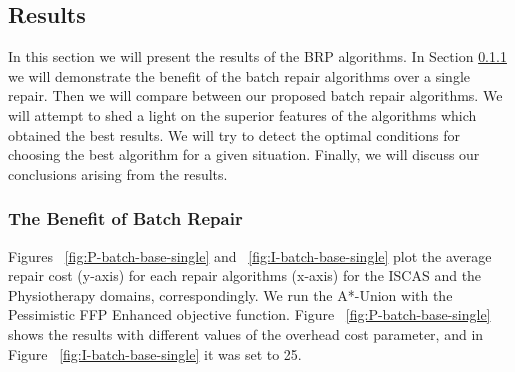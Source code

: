 \documentclass[review]{elsarticle}
\newcommand\meir[1]{\textcolor{red}{meir: #1}}
\begin{document}
\subsection{Results}
In this section we will present the results of the BRP algorithms. In Section \ref{sec:benefit-BR} we will demonstrate the benefit of the batch repair algorithms over a single repair. Then we will compare between our proposed batch repair algorithms. We will attempt to shed a light on the superior features of the algorithms which obtained the best results. We will try to detect the optimal conditions for choosing the best algorithm for a given situation. Finally, we will discuss our conclusions arising from the results. 

\subsubsection{The Benefit of Batch Repair}\label{sec:benefit-BR}


Figures ~\ref{fig:P-batch-base-single} and ~\ref{fig:I-batch-base-single} plot the average repair cost (y-axis) for each repair algorithms (x-axis) for the ISCAS and the Physiotherapy domains, correspondingly. 
We run the A*-Union with the Pessimistic FFP Enhanced objective function. %
Figure ~\ref{fig:P-batch-base-single} shows the results with different values of the overhead cost parameter, and in Figure ~\ref{fig:I-batch-base-single} it was set to 25. 
\end{document}
